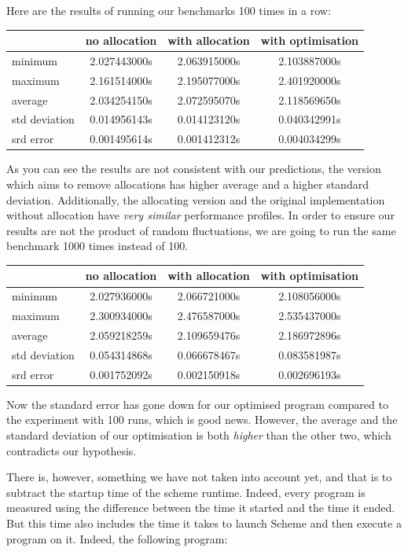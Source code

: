 \documentclass[
]{article}
\begin{document}
Here are the results of running our benchmarks 100 times in a row:

\begin{tabular}{ l | c c c }
          & no allocation & with allocation & with optimisation\\
\hline 
  minimum       & 2.027443000s & 2.063915000s & 2.103887000s \\
  maximum       & 2.161514000s & 2.195077000s & 2.401920000s \\ 
  average       & 2.034254150s & 2.072595070s & 2.118569650s \\
  std deviation & 0.014956143s & 0.014123120s & 0.040342991s \\
  srd error     & 0.001495614s & 0.001412312s & 0.004034299s \\
\end{tabular}

As you can see the results are not consistent with our predictions, the
version which aims to remove allocations has higher average and a higher
standard deviation. Additionally, the allocating version and the
original implementation without allocation have \emph{very similar}
performance profiles. In order to ensure our results are not the product
of random fluctuations, we are going to run the same benchmark 1000
times instead of 100.

\begin{tabular}{ l | c c c }
          & no allocation & with allocation & with optimisation\\
\hline 
  minimum       & 2.027936000s & 2.066721000s & 2.108056000s \\
  maximum       & 2.300934000s & 2.476587000s & 2.535437000s \\ 
  average       & 2.059218259s & 2.109659476s & 2.186972896s \\
  std deviation & 0.054314868s & 0.066678467s & 0.083581987s \\
  srd error     & 0.001752092s & 0.002150918s & 0.002696193s \\
\end{tabular}

Now the standard error has gone down for our optimised program compared
to the experiment with 100 runs, which is good news. However, the
average and the standard deviation of our optimisation is both
\emph{higher} than the other two, which contradicts our hypothesis.

There is, however, something we have not taken into account yet, and
that is to subtract the startup time of the scheme runtime. Indeed,
every program is measured using the difference between the time it
started and the time it ended. But this time also includes the time it
takes to launch Scheme and then execute a program on it. Indeed, the
following program:
\end{document}
